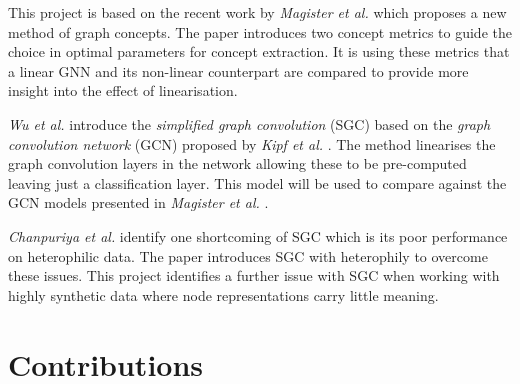 




This project is based on the recent work by \textit{Magister et al.} \cite{magister2021gcexplainer} which proposes a new method of graph concepts.
The paper introduces two concept metrics to guide the choice in optimal parameters for concept extraction.
It is using these metrics that a linear GNN and its non-linear counterpart are compared to provide more insight into the effect of linearisation.




\textit{Wu et al.} \cite{wu2019simplifying} introduce the \emph{simplified graph convolution} (SGC) based on the \emph{graph convolution network} (GCN) proposed by \textit{Kipf et al.} \cite{kipf2016semi}.
The method linearises the graph convolution layers in the network allowing these to be pre-computed leaving just a classification layer.
This model will be used to compare against the GCN models presented in \textit{Magister et al.} \cite{magister2021gcexplainer}.




\textit{Chanpuriya et al.} \cite{chanpuriya2022simplified} identify one shortcoming of SGC which is its poor performance on heterophilic data.
The paper introduces SGC with heterophily to overcome these issues. 
This project identifies a further issue with SGC when working with highly synthetic data where node representations carry little meaning.


\section{Contributions}

